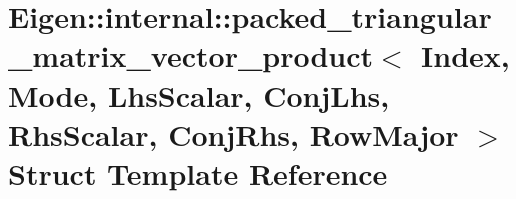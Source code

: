 \hypertarget{struct_eigen_1_1internal_1_1packed__triangular__matrix__vector__product_3_01_index_00_01_mode_00f4369f0f3f5b783c4128c16d4e97f7b3}{}\section{Eigen\+:\+:internal\+:\+:packed\+\_\+triangular\+\_\+matrix\+\_\+vector\+\_\+product$<$ Index, Mode, Lhs\+Scalar, Conj\+Lhs, Rhs\+Scalar, Conj\+Rhs, Row\+Major $>$ Struct Template Reference}
\label{struct_eigen_1_1internal_1_1packed__triangular__matrix__vector__product_3_01_index_00_01_mode_00f4369f0f3f5b783c4128c16d4e97f7b3}
